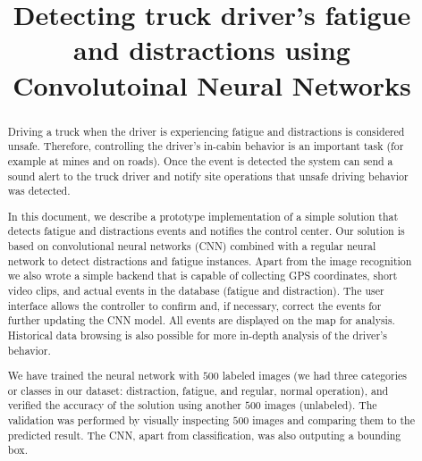 \documentclass[conference,10pt,letter]{IEEEtran}
\begin{document}
\sloppy
\title{Detecting truck driver's fatigue and distractions using Convolutoinal Neural Networks}
\maketitle
\begin{abstract}

    Driving a truck when the driver is experiencing fatigue and distractions 
    is considered unsafe. Therefore, controlling the driver's in-cabin behavior is 
    an important task (for example at mines and on roads). Once the event is detected 
    the system can send a sound alert to the truck driver and notify site operations 
    that unsafe driving behavior was detected.

    In this document, we describe a prototype implementation of a simple solution that 
    detects fatigue and distractions events and notifies the control center. Our solution 
    is based on convolutional neural networks (CNN) combined with a regular neural network 
    to detect distractions and fatigue instances. Apart from the image recognition we also 
    wrote a simple backend that is capable of collecting GPS coordinates, short video 
    clips, and actual events in the database (fatigue and distraction). The user interface 
    allows the controller to confirm and, if necessary, correct the events for further 
    updating the CNN model. All events are displayed on the map for analysis. Historical 
    data browsing is also possible for more in-depth analysis of the driver's behavior. 
    
    We have trained the neural network with $500$ labeled images (we had three categories or classes in our dataset: 
    distraction, fatigue, and regular, normal operation), and verified the accuracy of the solution using another 
    $500$ images (unlabeled). The validation was performed by visually inspecting $500$ images and comparing them to 
    the predicted result. The CNN, apart from classification, was also outputing a bounding box.  


\end{abstract}

%
%
%
%
%
%
\end{document}
